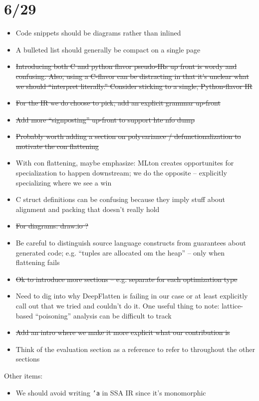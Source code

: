 \section{6/29}
\begin{itemize}
\item Code snippets should be diagrams rather than inlined

\item A bulleted list should generally be compact on a single page

\item \st{Introducing both C and python flavor pseudo-IRs up front is wordy and
  confusing. Also, using a C-flavor can be distracting in that it's unclear what
  we should ``interpret literally.'' Consider sticking to a single,
  Python-flavor IR}

\item \st{For the IR we do choose to pick, add an explicit grammar up-front}

\item \st{Add more ``signposting'' up-front to support hte nfo dump}

\item \st{Probably worth adding a section on polyvariance / defunctionalization to
  motivate the con flattening}

\item With con flattening, maybe emphasize: MLton creates opportunites for
  specialization to happen downstream; we do the opposite -- explicitly
  specializing where we see a win

\item C struct definitions can be confusing because they imply stuff about
  alignment and packing that doesn't really hold

\item \st{For diagrams: draw.io ?}

\item Be careful to distinguish source language constructs from guarantees about
  generated code; e.g. ``tuples are allocated om the heap'' -- only when
  flattening fails

\item \st{Ok to introduce more sections -- e.g. separate for each optimization type}

\item Need to dig into why DeepFlatten is failing in our case or at least
  explicitly call out that we tried and couldn't do it. One useful thing to
  note: lattice-based ``poisoning'' analysis can be difficult to track

\item \st{Add an intro where we make it more explicit what our contribution is}

\item Think of the evaluation section as a reference to refer to throughout the
  other sections

\end{itemize}

Other items:
\begin{itemize}
\item We should avoid writing \texttt{'a} in SSA IR since it's monomorphic
\end{itemize}



